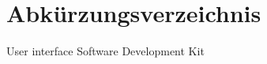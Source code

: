 
\chapter*{Abkürzungsverzeichnis}

\begin{acronym}
  {User interface}
  {Software Development Kit}
\end{acronym}
